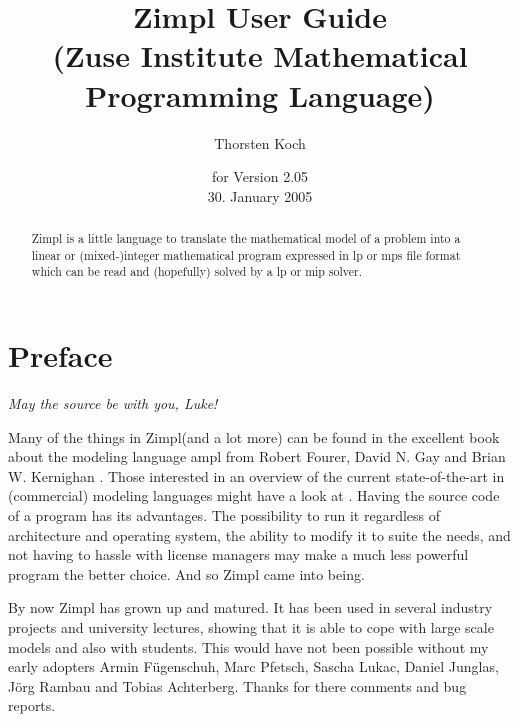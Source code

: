 \documentclass[11pt]{article}
\newcommand{\zimpl}{{\sc Zimpl}\xspace}
\newcommand{\lp}{{\sc lp}\xspace}
\newcommand{\mip}{{\sc mip}\xspace}
\newcommand{\mps}{{\sc mps}\xspace}
\newcommand{\lpf}{{\sc lp}\xspace}
\newcommand{\ampl}{{\sc ampl}\xspace}
\newcommand{\ilog}{{\sc ilog}\xspace}
\newcommand{\cplex}{{\sc cplex}\xspace}
\begin{document}

\title{
\LARGE\zimpl User Guide\\
\normalsize (Zuse Institute Mathematical Programming Language)}
\author{Thorsten Koch}
\date{\small for Version 2.05\\30. January 2005}
\maketitle
\vfill
\tableofcontents
\newpage
\begin{abstract}
\zimpl is a little language to translate the mathematical model of a 
problem into a linear or (mixed-)integer mathematical program
expressed in \lpf or \mps file format which can be read
and (hopefully) solved by a \lp or \mip solver.
\end{abstract}
\section{Preface}
\begin{flushright}
{\em May the source be with you, Luke!}
\end{flushright}
Many of the things in \zimpl (and a lot more) can be found in 
the excellent book about the modeling language \ampl 
from Robert Fourer, David N. Gay and Brian W. Kernighan
\cite{FourierGayKernighan2003}. Those interested in an overview of the
current state-of-the-art in (commercial) modeling languages might have
a look at \cite{Kallrath2004}.
Having the source code of a program has its advantages. The
possibility to run it regardless of architecture and operating system, the
ability to modify it to suite the needs, and not having to hassle with license
managers may make a much less powerful program the better choice.
And so \zimpl came into being.

\bigskip
By now \zimpl has grown up and matured. It has been used in several
industry projects and university lectures, showing that it is able to
cope with large scale models and also with students.
This would have not been possible without my early adopters 
Armin F\"ugenschuh, Marc Pfetsch, Sascha Lukac, Daniel Junglas, J\"org
Rambau and Tobias Achterberg. Thanks for there comments and bug
reports.
\end{document}

